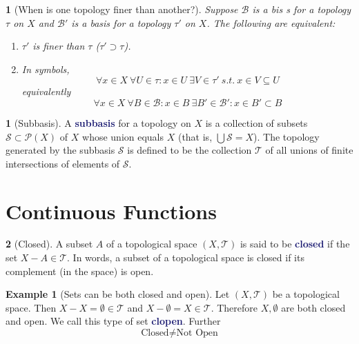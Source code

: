 \documentclass[11pt]{article}
\numberwithin{equation}{section}
\newcommand{\navy}[1]{\textcolor{MidnightBlue}{\bf #1}}
\theoremstyle{plain}
\newtheorem{lemma}[theorem]{\color{ForestGreen}{\textbf{Lemma}}}
\theoremstyle{definition}
\newtheorem{definition}{\color{MidnightBlue}{\textbf{Definition}}}[section]
\newtheorem{example}{\color{WildStrawberry}Example}[section]
\def\ss{\subset}
\def\sse{\subseteq}
\newcommand{\1}{\mathbbm 1}
\def\t{\tau}
\newcommand{\pP}{\mathcal P}
\newcommand{\tT}{\mathcal T}
\newcommand{\bB}{\mathcal B}
\newcommand{\sS}{\mathcal S}
\begin{document}
\begin{lemma}[When is one topology finer than another?]
	Suppose $\bB$ is a bis s for a topology $\t$ on $X$ and $\bB'$ is a basis for a topology $\t'$ on $X$. The following are equivalent:
	\begin{enumerate}
		\item $\t'$ is finer than $\t$ ($\t' \supset \t$). 
		\item In symbols,
		\begin{equation}
			\forall x\in X \ \forall U \in \t: x \in U \ \exists V \in \t' \ s.t. \ x \in V\sse U
		\end{equation}
		equivalently
		\begin{equation}
			\forall x \in X \ \forall B \in \bB : x \in B \ \exists B' \in \bB' : x \in B' \ss B
		\end{equation}
	\end{enumerate}
\end{lemma}

\begin{definition}[Subbasis]
	A \navy{subbasis} for a topology on $X$ is a collection of subsets $\sS \ss \pP(X)$ of $X$ whose union equals $X$ (that is, $\bigcup \sS = X$). The topology generated by the subbasis $\sS$ is defined to be the collection $\tT$ of all unions of finite intersections of elements of $\sS$.
\end{definition}

\section{Continuous Functions}

\begin{definition}[Closed]
	A subset $A$ of a topological space $(X,\tT)$ is said to be \navy{closed} if the set $X - A \in \tT$. In words, a subset of a topological space is closed if its complement (in the space) is open. 
\end{definition}

\begin{example}[Sets can be both closed and open]
	Let $(X,\tT)$ be a topological space. Then $X - X = \emptyset \in \tT$ and $X - \emptyset = X \in \tT$. Therefore $X, \emptyset$ are both closed and open. We call this type of set \navy{clopen}. Further
	\begin{equation}
		\text{Closed} \neq \text{Not Open}
	\end{equation}
\end{example}
\end{document}
